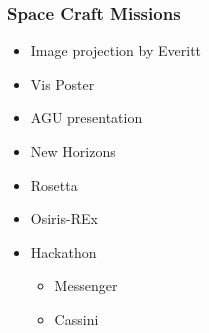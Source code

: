 \subsubsection{Space Craft Missions} \label{contributions:astro:openspace:spacecraft}
\begin{itemize}
    \item Image projection by Everitt \cite{everitt2001hardware}
    \item Vis Poster\cite{bock15openspace}
    \item AGU presentation \cite{bock15bopenspace}
    \item New Horizons
    \item Rosetta
    \item Osiris-REx
    \item Hackathon
    \begin{itemize}
        \item Messenger
        \item Cassini
    \end{itemize}
\end{itemize}
